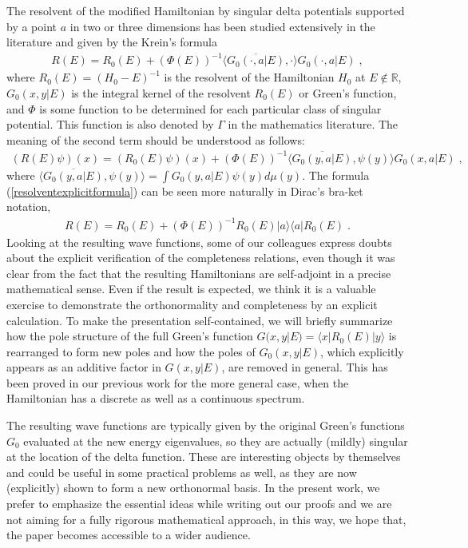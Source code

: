 \documentclass[amsmath,amssymb,14pt]{article}
\numberwithin{equation}{section}
\begin{document}
The resolvent of the modified Hamiltonian by singular delta potentials supported by a point $a$ in two or three dimensions has been studied extensively in the literature and given by the Krein's formula \cite{Albeverio2012solvable, AlbeverioKurasov}
%
\begin{eqnarray}
    R(E)=R_0(E) + (\Phi(E))^{-1} \langle \overline{G_0(\cdot, a|E)}, \cdot \rangle G_0(\cdot, a|E) \;, \label{resolventexplicitformula}
\end{eqnarray}
%
where $R_0(E)=(H_0-E)^{-1}$ is the resolvent of the Hamiltonian $H_0$ at $E \notin \mathbb{R}$, $G_0(x,y|E)$ is the integral kernel of the resolvent $R_0(E)$ or Green's function, and $\Phi$ is some function to be determined for each particular class of singular potential. This function is also denoted by $\Gamma$ in the mathematics literature. The meaning of the second term should be understood as follows: 
%
\begin{eqnarray}
    (R(E) \psi)(x)=(R_0(E)\psi)(x) + (\Phi(E))^{-1} \langle \overline{G_0(y, a|E)}, \psi(y) \rangle G_0(x, a|E) \;, 
\end{eqnarray}
%
where $\langle \overline{G_0(y, a|E)}, \psi(y) \rangle = \int G_0(y, a|E) \psi(y) d \mu(y)$. The formula (\ref{resolventexplicitformula}) can be seen more naturally in Dirac's bra-ket notation, 
%
\begin{eqnarray}
    R(E) = R_0(E) + (\Phi(E))^{-1} R_0(E) |a \rangle \langle a | R_0(E) \;.
\end{eqnarray}
%
Looking at the resulting wave functions, some of our colleagues express doubts about the explicit verification of the completeness relations, even though it was clear from the fact that the resulting Hamiltonians are self-adjoint in a precise mathematical sense. Even if the result is expected, we think it is a valuable exercise to demonstrate the orthonormality and completeness by an explicit calculation. 
To make the presentation self-contained, we will briefly summarize how the pole structure of the full Green's function $G(x,y|E)=\langle x |R_0(E)|y\rangle$ is rearranged to form new poles and how the poles of $G_0(x,y|E)$, which explicitly appears as an additive factor in $G(x,y|E)$, are removed in general. This has been proved in our previous work \cite{Annals23} for the more general case, when the Hamiltonian has a discrete as well as a continuous spectrum.

The resulting wave functions are typically given by the original Green's functions $G_0$ evaluated at the new energy eigenvalues, so they are actually (mildly) singular at the location of the delta function. These are interesting objects by themselves and could be useful in some practical problems as well, as they are now (explicitly) shown to form a new orthonormal basis. In the present work, we prefer to emphasize the essential ideas while writing out  our proofs and we are not aiming for a fully  rigorous mathematical approach, in this way,  we hope that, the paper becomes accessible to  a wider audience.   
\end{document}
